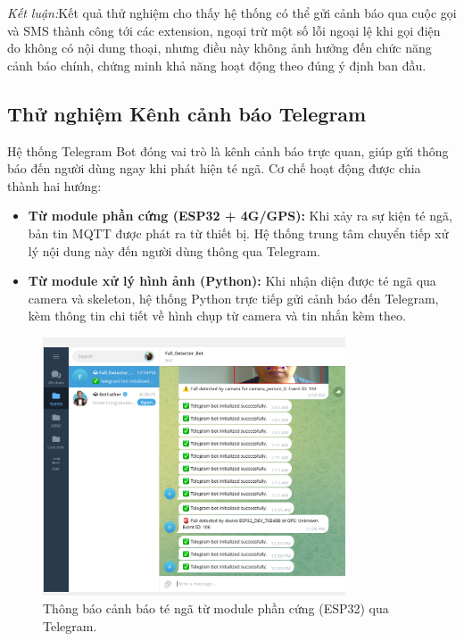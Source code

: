 \textit{Kết luận:}Kết quả thử nghiệm cho thấy hệ thống có thể gửi cảnh báo qua cuộc gọi và SMS thành công tới các extension, ngoại trừ một số lỗi ngoại lệ khi gọi điện do không có nội dung thoại, nhưng điều này không ảnh hưởng đến chức năng cảnh báo chính, chứng minh khả năng hoạt động theo đúng ý định ban đầu.

\subsection{Thử nghiệm Kênh cảnh báo Telegram}
\label{sec:telegram_alert}

Hệ thống Telegram Bot đóng vai trò là kênh cảnh báo trực quan, giúp gửi thông báo đến người dùng ngay khi phát hiện té ngã.  
Cơ chế hoạt động được chia thành hai hướng:
\begin{itemize}
    \item \textbf{Từ module phần cứng (ESP32 + 4G/GPS):} Khi xảy ra sự kiện té ngã, bản tin MQTT được phát ra từ thiết bị. Hệ thống trung tâm chuyển tiếp xử lý nội dung này đến người dùng thông qua Telegram.
    \item \textbf{Từ module xử lý hình ảnh (Python):} Khi nhận diện được té ngã qua camera và skeleton, hệ thống Python trực tiếp gửi cảnh báo đến Telegram, kèm thông tin chi tiết về hình chụp từ camera và tin nhắn kèm theo.
\end{itemize}

\begin{figure}[H]
    \centering
    \includegraphics[width=0.8\textwidth]{figures/telegram_fall_module1_send.png}
    \caption{Thông báo cảnh báo té ngã từ module phần cứng (ESP32) qua Telegram.}
    \label{fig:telegram_hw}
\end{figure}

